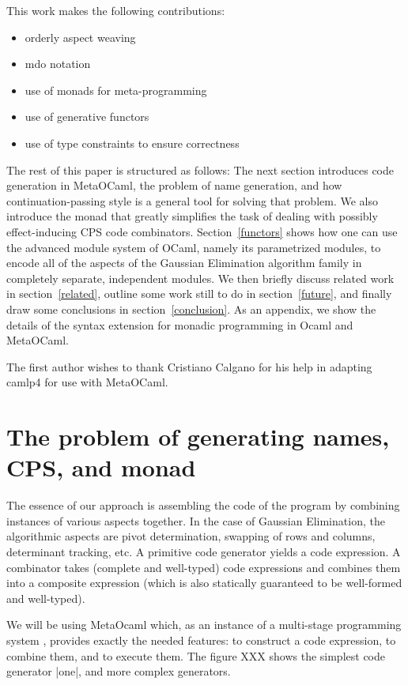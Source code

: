 \documentclass{llncs}
\begin{document}
This work makes the following contributions:
\begin{itemize}
    \item orderly aspect weaving
    \item mdo notation
    \item use of monads for meta-programming
    \item use of generative functors
    \item use of type constraints to ensure correctness
\end{itemize}

The rest of this paper is structured as follows:
The next section introduces code generation in MetaOCaml, the problem
of name generation, and how continuation-passing style is a general
tool for solving that problem.  We also introduce
the monad that greatly simplifies the task of dealing with
possibly effect-inducing CPS code combinators.  Section~\ref{functors}
shows how one can use the advanced module system of OCaml, namely its
parametrized modules, to encode all of the aspects of the Gaussian
Elimination algorithm family in completely separate, independent modules.
We then briefly discuss related work in section~\ref{related}, outline
some work still to do in section~\ref{future}, and finally draw some 
conclusions in section~\ref{conclusion}.  As an appendix, we show
the details of the syntax extension for monadic programming in Ocaml
and MetaOCaml.

The first author wishes to thank Cristiano Calgano for his help in
adapting camlp4 for use with MetaOCaml.

\section{The problem of generating names, CPS, and monad}\label{CPS}

The essence of our approach is assembling the code of the program by
combining instances of various aspects together. In the case of
Gaussian Elimination, the algorithmic aspects are pivot determination, 
swapping of
rows and columns, determinant tracking, etc. A primitive code
generator yields a code expression.  A combinator takes (complete and
well-typed) code expressions and combines them into a composite expression
(which is also statically guaranteed to be well-formed and well-typed).

We will be using MetaOcaml which, as an instance of a multi-stage
programming system \cite{TahaThesis}, provides exactly the needed
features: to construct a code expression, to combine them, and to
execute them. The figure XXX shows the simplest code generator |one|,
and more complex generators.
\end{document}
